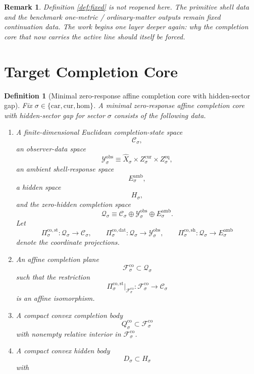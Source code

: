 \documentclass[11pt]{article}
\newcommand{\Car}{\mathrm{car}}
\newcommand{\Cur}{\mathrm{cur}}
\newcommand{\Hom}{\mathrm{hom}}
\newcommand{\VisibleAffine}[1]{\widehat X_{#1}}
\newcommand{\DataSpace}[1]{\mathcal Y_{#1}^{\mathrm{obs}}}
\newcommand{\AmbientTarget}[1]{E_{#1}^{\mathrm{amb}}}
\newcommand{\GapSpace}[1]{H_{#1}}
\newcommand{\GapBody}[1]{D_{#1}}
\newcommand{\CoreState}[1]{\mathcal C_{#1}}
\newcommand{\CoreSpace}[1]{\mathcal Q_{#1}}
\newcommand{\CoreAffine}[1]{\mathcal F_{#1}^{\mathrm{co}}}
\newcommand{\CoreBody}[1]{Q_{#1}^{\mathrm{co}}}
\newcommand{\CoreStateProj}[1]{\Pi_{#1}^{\mathrm{co,st}}}
\newcommand{\CoreDataProj}[1]{\Pi_{#1}^{\mathrm{co,dat}}}
\newcommand{\CoreShellProj}[1]{\Pi_{#1}^{\mathrm{co,sh}}}
\newtheorem{definition}{Definition}
\newtheorem{remark}{Remark}
\begin{document}
\begin{remark}
Definition \ref{def:fixed} is not reopened here. The primitive shell data and the benchmark one-metric / ordinary-matter outputs remain fixed continuation data. The work begins one layer deeper again: why the completion core that now carries the active line should itself be forced.
\end{remark}

\section{Target Completion Core}

\begin{definition}[Minimal zero-response affine completion core with hidden-sector gap]
\label{def:core}
Fix \(\sigma\in\{\Car,\Cur,\Hom\}\). A \emph{minimal zero-response affine completion core with hidden-sector gap} for sector \(\sigma\) consists of the following data.
\begin{enumerate}
    \item A finite-dimensional Euclidean completion-state space
    \[
    \CoreState{\sigma},
    \]
    an observer-data space
    \[
    \DataSpace{\sigma}
    \equiv
    \VisibleAffine{\sigma}\times Z_{\sigma}^{\mathrm{cur}}\times Z_{\sigma}^{\mathrm{eq}},
    \]
    an ambient shell-response space
    \[
    \AmbientTarget{\sigma},
    \]
    a hidden space
    \[
    \GapSpace{\sigma},
    \]
    and the zero-hidden completion space
    \[
    \CoreSpace{\sigma}
    \equiv
    \CoreState{\sigma}\oplus\DataSpace{\sigma}\oplus\AmbientTarget{\sigma}.
    \]
    Let
    \[
    \CoreStateProj{\sigma}:\CoreSpace{\sigma}\to\CoreState{\sigma},
    \qquad
    \CoreDataProj{\sigma}:\CoreSpace{\sigma}\to\DataSpace{\sigma},
    \qquad
    \CoreShellProj{\sigma}:\CoreSpace{\sigma}\to\AmbientTarget{\sigma}
    \]
    denote the coordinate projections.
    \item An affine completion plane
    \[
    \CoreAffine{\sigma}\subset\CoreSpace{\sigma}
    \]
    such that the restriction
    \[
    \CoreStateProj{\sigma}\big|_{\CoreAffine{\sigma}}:
    \CoreAffine{\sigma}\to\CoreState{\sigma}
    \]
    is an affine isomorphism.
    \item A compact convex completion body
    \[
    \CoreBody{\sigma}\subset\CoreAffine{\sigma}
    \]
    with nonempty relative interior in \(\CoreAffine{\sigma}\).
    \item A compact convex hidden body
    \[
    \GapBody{\sigma}\subset\GapSpace{\sigma}
    \]
    with

\end{enumerate}
\end{definition}
\end{document}
